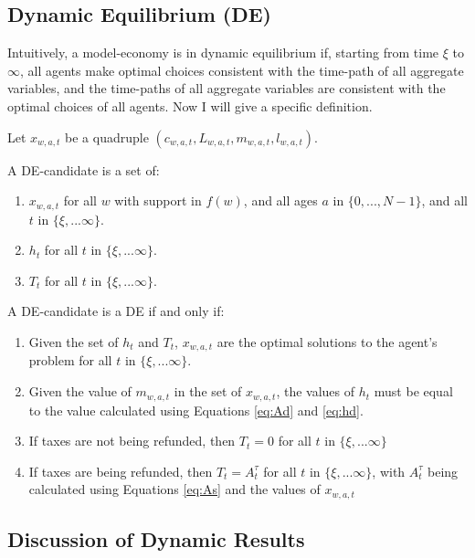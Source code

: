 \documentclass[letter, 12pt, epsf,leqno]{article}
\begin{document}
\subsection{Dynamic Equilibrium (DE)}
Intuitively, a model-economy is in dynamic equilibrium if, starting from time $\xi$ to $\infty$, all agents make optimal choices consistent with the time-path of all aggregate variables, and the time-paths of all aggregate variables are consistent with the optimal choices of all agents.  Now I will give a specific definition.\par


Let $x_{w,a,t}$ be a quadruple $(c_{w,a,t}, L_{w,a,t}, m_{w,a,t}, l_{w,a,t})$.\par
A DE-candidate is a set of:\\
\begin{enumerate}
\item $x_{w, a, t}$ for all $w$ with support in $f(w)$, and all ages $a$ in $\{0,..., N-1\}$, and all $t$ in $\{\xi,...\infty\}$.\\
\item $h_t$ for all $t$ in $\{\xi,...\infty\}$.\\
\item $T_t$ for all $t$ in $\{\xi,...\infty\}$.
\end{enumerate}

A DE-candidate is a DE if and only if:
 \begin{enumerate}

\item Given the set of $h_t$ and $T_t$, $x_{w,a,t}$ are the optimal solutions to the agent's problem for all $t$ in $\{\xi,...\infty\}$.
\item Given the value of $m_{w,a,t}$ in the set of $x_{w,a,t}$, the values of $h_t$ must be equal to the value calculated using Equations \ref{eq:Ad} and \ref{eq:hd}.
\item If taxes are not being refunded, then $T_t=0$ for all $t$ in $\{\xi,...\infty\}$\\
\item If taxes are being refunded, then $T_t = A^\tau_t$ for all $t$ in $\{\xi,...\infty\}$, with $A^\tau_t$ being calculated using Equations \ref{eq:As} and the values of $x_{w, a, t}$
\end{enumerate}



\subsection{Discussion of Dynamic Results}
\end{document}

